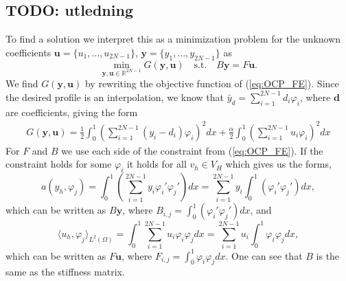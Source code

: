 \subsection{TODO: utledning}
To find a solution we interpret this as a minimization problem for the unknown coefficients $\mathbf{u} = \{u_1, \dots, u_{2N-1} \}$, $\mathbf{y} = \{y_1, \dots, y_{2N-1} \}$ as
\begin{equation}
    \label{eq:OCP_coeff}
    \min_{\mathbf{y,u} \in \mathds{R}^{2N-1}} G(\mathbf{y, u}) \quad \text{s.t.} \quad B\mathbf{y} = F\mathbf{u}.
\end{equation}
We find $G(\mathbf{y, u})$ by rewriting the objective function of (\ref{eq:OCP_FE}).
Since the desired profile is an interpolation, we know that $\bar{y}_d = \sum_{i=1}^{2N-1}d_i\varphi_i$, where $\mathbf{d}$ are coefficients, giving the form
\begin{align*}
    G(\mathbf{y, u}) = \frac{1}{2}\int_0^1\left( \sum_{i=1}^{2N-1}\left( y_i -d_i\right) \varphi_i \right)^2dx + \frac{\alpha}{2}\int_0^1\left(\sum_{i=1}^{2N-1} u_i \varphi_i  \right)^2dx     
\end{align*}
For $F$ and $B$ we use each side of the constraint from (\ref{eq:OCP_FE}). If the constraint holds for some $\varphi_i$ it holds for all $v_h\in V_H$ which gives us the forms,
$$a(y_h, \varphi_j) = \int_0^1 \left( \sum_{i=1}^{2N-1} y_i \varphi_i' \varphi_j' \right)dx =\sum_{i=1}^{2N-1} y_i\int_0^1 \left( \varphi_i' \varphi_j' \right)dx,$$
which can be written as $B\mathbf{y}$, where $B_{i,j} = \int_0^1\left( \varphi_i' \varphi_j' \right)dx$, and  
$$\langle u_h, \varphi_j \rangle_{L^2(\Omega)} = \int_0^1 \sum_{i=1}^{2N-1} u_i \varphi_i \varphi_j dx =\sum_{i=1}^{2N-1} u_i \int_0^1  \varphi_i \varphi_j dx,$$
which can be written as $F\mathbf{u}$, where $F_{i,j}=\int_0^1  \varphi_i \varphi_j dx$.
One can see that $B$ is the same as the stiffness matrix.


